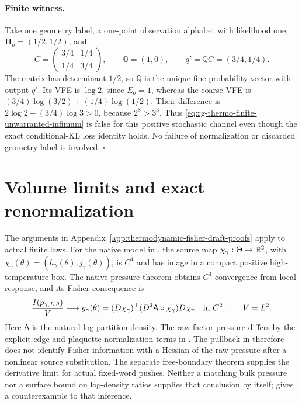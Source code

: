 \paragraph{Finite witness.}
Take one geometry label, a one-point observation alphabet with likelihood
one, $\boldsymbol\Pi_o=(1/2,1/2)$, and
\begin{equation}
 C=\begin{pmatrix}3/4&1/4\\1/4&3/4\end{pmatrix},
 \qquad \mathbb Q=(1,0),
 \qquad q'=\mathbb Q C=(3/4,1/4).
 \label{eq:rg-thermo-finite-stochastic-infimum-witness}
\end{equation}
The matrix has determinant $1/2$, so $\mathbb Q$ is the unique fine
probability vector with output $q'$. Its VFE is $\log2$, since $E_o=1$,
whereas the coarse VFE is
$(3/4)\log(3/2)+(1/4)\log(1/2)$.
Their difference is $2\log2-(3/4)\log3>0$, because
$2^8>3^3$. Thus \cref{eq:rg-thermo-finite-unwarranted-infimum} is false
for this positive stochastic channel even though the exact conditional-KL
loss identity holds. No failure of normalization or discarded geometry
label is involved. $\square$\thermoestablishedstatus



\section{Volume limits and exact renormalization}
\label{sec:rg-thermo-draft-limit-organization}

The arguments in Appendix~\ref{app:thermodynamic-fisher-draft-proofs} apply to
actual finite laws. For the native model in
, the source map
$\chi_\gamma:\Theta\to\mathbb R^2$, with
$\chi_\gamma(\theta)=(h_\gamma(\theta),j_\gamma(\theta))$, is $C^4$ and
has image in a compact positive high-temperature box. The native
pressure theorem obtains $C^4$ convergence from local response, and its
Fisher consequence is
\begin{equation}
 \frac{I(p_{\gamma,L,\theta})}{V}
 \longrightarrow
 g_\gamma(\theta)
 =(D\chi_\gamma)^\top
   (D^2\mathsf A\circ\chi_\gamma)D\chi_\gamma
 \quad\hbox{in }C^2,\qquad V=L^2.
 \label{eq:rg-thermo-draft-native-density}
\end{equation}
Here $\mathsf A$ is the natural log-partition density. The raw-factor
pressure differs by the explicit edge and plaquette normalization
terms in . The pullback in
 therefore does not identify
Fisher information with a Hessian of the raw pressure after a nonlinear
source substitution. The separate free-boundary theorem
 supplies the derivative limit
for actual fixed-word pushes. Neither a matching bulk pressure nor a
surface bound on log-density ratios supplies that conclusion by itself;
 gives a
counterexample to that inference.\thermoestablishedstatus

